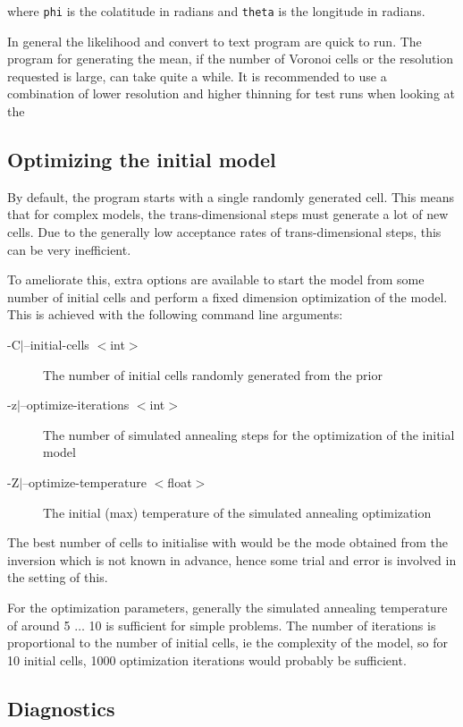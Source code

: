 \documentclass{article}
\begin{document}
where {\tt phi} is the colatitude in radians and {\tt theta} is the longitude in radians.

In general the likelihood and convert to text program are quick to run. The program for
generating the mean, if the number of Voronoi cells or the resolution requested is large,
can take quite a while. It is recommended to use a combination of lower resolution and
higher thinning for test runs when looking at the 

\subsection{Optimizing the initial model}

By default, the program starts with a single randomly generated cell. This means that
for complex models, the trans-dimensional steps must generate a lot of new cells.
Due to the generally low acceptance rates of trans-dimensional steps, this can be
very inefficient.

To ameliorate this, extra options are available to start the model from some number of
initial cells and perform a fixed dimension optimization of the model. This is achieved
with the following command line arguments:

\begin{description}
\item [-C$|$--initial-cells $<$int$>$] The number of initial cells randomly generated
  from the prior
\item [-z$|$--optimize-iterations $<$int$>$] The number of simulated annealing steps for
  the optimization of the initial model
\item [-Z$|$--optimize-temperature $<$float$>$] The initial (max) temperature of the simulated
  annealing optimization
\end{description}

The best number of cells to initialise with would be the mode obtained
from the inversion which is not known in advance, hence some trial and
error is involved in the setting of this.

For the optimization parameters, generally the simulated annealing
temperature of around 5 $\ldots$ 10 is sufficient for simple
problems. The number of iterations is proportional to the number of
initial cells, ie the complexity of the model, so for 10 initial
cells, 1000 optimization iterations would probably be sufficient.

\subsection{Diagnostics}
\end{document}
